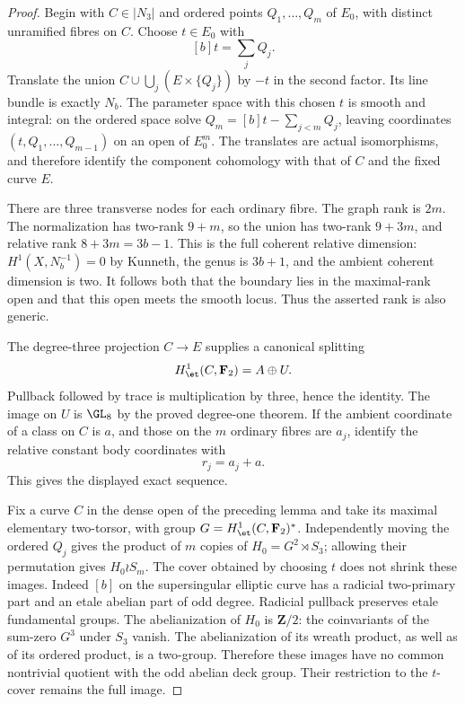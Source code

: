 \begin{proof}
Begin with $C\in|N_3|$ and ordered points $Q_1,\ldots,Q_m$
of $E_0$, with distinct unramified fibres on $C$. Choose $t\in E_0$
with
\[
                         [b]t=\sum_j Q_j.
\]
Translate the union $C\cup\bigcup_j(E\times\{Q_j\})$ by
$-t$ in the second factor. Its line bundle is exactly $N_b$.
The parameter space with this chosen $t$ is smooth and integral:
on the ordered space solve
$Q_m=[b]t-\sum_{j<m}Q_j$, leaving coordinates
$(t,Q_1,\ldots,Q_{m-1})$ on an open of $E_0^m$.
The translates are actual isomorphisms, and therefore identify
the component cohomology with that of $C$ and the fixed curve $E$.

There are three transverse nodes for each ordinary fibre.
The graph rank is $2m$. The normalization has two-rank $9+m$,
so the union has two-rank $9+3m$, and relative rank
$8+3m=3b-1$. This is the full coherent relative dimension:
$H^1(X,N_b^{-1})=0$ by Kunneth, the genus is $3b+1$, and the
ambient coherent dimension is two. It follows both that the
boundary lies in the maximal-rank open and that this open meets
the smooth locus. Thus the asserted rank is also generic.

The degree-three projection $C\to E$ supplies a canonical
splitting
\[
 H^1_{\et}(C,\mathbf F_2)=A\oplus U.
\]
Pullback followed by trace is multiplication by three, hence the
identity. The image on $U$ is $\GL_8$ by the proved degree-one
theorem. If the ambient coordinate of a class on $C$ is $a$,
and those on the $m$ ordinary fibres are $a_j$, identify the
relative constant body coordinates with
\[
                              r_j=a_j+a.                 \tag{Strip-2}
\]
This gives the displayed exact sequence.

Fix a curve $C$ in the dense open of the preceding lemma and
take its maximal elementary two-torsor, with group
$G=H^1_{\et}(C,\mathbf F_2)^*$. Independently moving the ordered
$Q_j$ gives the product of $m$ copies of
$H_0=G^2\rtimes S_3$; allowing their permutation gives
$H_0\wr S_m$. The cover obtained by choosing $t$ does not shrink
these images. Indeed $[b]$ on the supersingular elliptic curve
has a radicial two-primary part and an etale abelian part of odd
degree. Radicial pullback preserves etale fundamental groups.
The abelianization of $H_0$ is $\mathbf Z/2$: the coinvariants
of the sum-zero $G^3$ under $S_3$ vanish. The abelianization of
its wreath product, as well as of its ordered product, is a
two-group. Therefore these images have no common nontrivial
quotient with the odd abelian deck group. Their restriction to
the $t$-cover remains the full image.


\end{proof}

